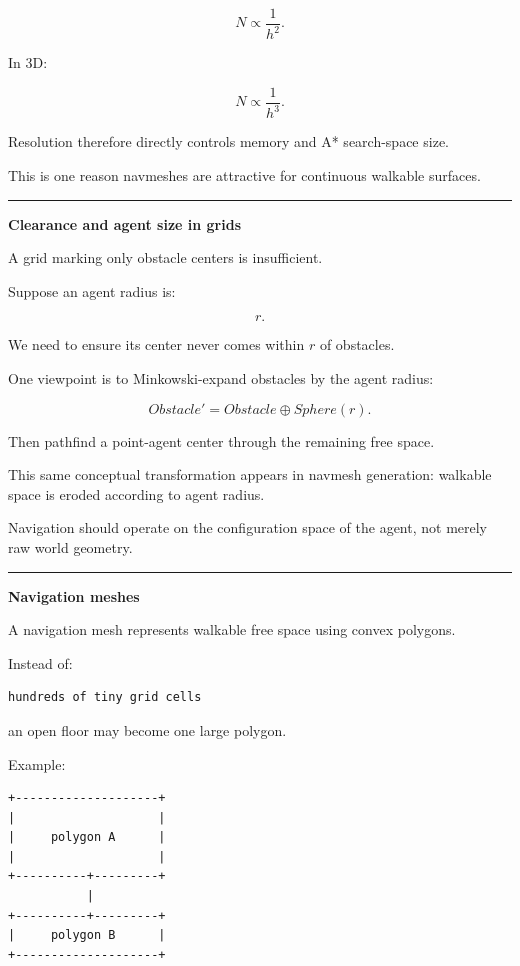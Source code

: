 \[
N\propto\frac1{h^2}.
\]

In 3D:

\[
N\propto\frac1{h^3}.
\]

Resolution therefore directly controls memory and A* search-space size.

This is one reason navmeshes are attractive for continuous walkable surfaces.

\begin{center}\rule{0.5\linewidth}{0.5pt}\end{center}

\textbf{Clearance and agent size in grids}

A grid marking only obstacle centers is insufficient.

Suppose an agent radius is:

\[
r.
\]

We need to ensure its center never comes within \(r\) of obstacles.

One viewpoint is to Minkowski-expand obstacles by the agent radius:

\[
Obstacle'
=
Obstacle\oplus Sphere(r).
\]

Then pathfind a point-agent center through the remaining free space.

This same conceptual transformation appears in navmesh generation: walkable space is eroded according to agent radius.

Navigation should operate on the configuration space of the agent, not merely raw world geometry.

\begin{center}\rule{0.5\linewidth}{0.5pt}\end{center}

\textbf{Navigation meshes}

A navigation mesh represents walkable free space using convex polygons.

Instead of:

\begin{verbatim}
hundreds of tiny grid cells
\end{verbatim}

an open floor may become one large polygon.

Example:

\begin{verbatim}
+--------------------+
|                    |
|     polygon A      |
|                    |
+----------+---------+
           |
+----------+---------+
|     polygon B      |
+--------------------+
\end{verbatim}

